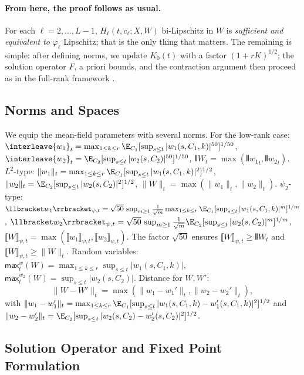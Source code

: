 \documentclass[nohyperref]{article}
\theoremstyle{plain}
\theoremstyle{definition}
\theoremstyle{remark}
\begin{document}
\paragraph*{From here, the proof follows as usual.} For each $\ell=2,\ldots,L-1$, $H_\ell(t,c_\ell;X,W)$ bi-Lipschitz in $W$ is \emph{sufficient and equivalent to} $\varphi_\ell$ Lipschitz; that is the only thing that matters. The remaining is simple: after defining norms, we update $K_0(t)$ with a factor $(1+rK)^{1/2}$; the solution operator $F$, a priori bounds, and the contraction argument then proceed as in the full-rank framework \cite{nguyen2023rigorousframeworkmeanfield}.

\subsection{Norms and Spaces}
\label{app:wellposed-norms}

We equip the mean-field parameters with several norms. For the low-rank case: ${\interleave{w_1}}_t = \max_{1\le k\le r}\E_{C_1}[\sup_{s\le t}|w_1(s,C_1,k)|^{50}]^{1/50}$, ${\interleave{w_2}}_t = \E_{C_2}[\sup_{s\le t}|w_2(s,C_2)|^{50}]^{1/50}$, ${\interleave{W}}_t = \max({\interleave{w_1}}_t, {\interleave{w_2}}_t)$. $L^2$-type: $\|w_1\|_t = \max_{1\le k\le r}\E_{C_1}[\sup_{s\le t}|w_1(s,C_1,k)|^2]^{1/2}$, $\|w_2\|_t = \E_{C_2}[\sup_{s\le t}|w_2(s,C_2)|^2]^{1/2}$, $\|W\|_t = \max(\|w_1\|_t, \|w_2\|_t)$. $\psi_2$-type: $\llbracket w_1\rrbracket_{\psi,t} = \sqrt{50}\,\sup_{m\ge 1}\frac{1}{\sqrt{m}}\max_{1\le k\le r}\E_{C_1}[\sup_{s\le t}|w_1(s,C_1,k)|^m]^{1/m}$, $\llbracket w_2\rrbracket_{\psi,t} = \sqrt{50}\,\sup_{m\ge 1}\frac{1}{\sqrt{m}}\E_{C_2}[\sup_{s\le t}|w_2(s,C_2)|^m]^{1/m}$, $\llbracket W\rrbracket_{\psi,t} = \max(\llbracket w_1\rrbracket_{\psi,t}, \llbracket w_2\rrbracket_{\psi,t})$. The factor $\sqrt{50}$ ensures $\llbracket W\rrbracket_{\psi,t}\ge {\interleave{W}}_t$ and $\llbracket W\rrbracket_{\psi,t}\ge \|W\|_t$. Random variables: $\mathsf{max}_t^w(W) = \max_{1\le k\le r}\sup_{s\le t}|w_1(s,C_1,k)|$, $\mathsf{max}_t^{w_2}(W) = \sup_{s\le t}|w_2(s,C_2)|$. Distance for $W,W'$:
\begin{equation}\label{eq:def-MF-distance-app}\|W-W'\|_t = \max(\|w_1-w_1'\|_t, \|w_2-w_2'\|_t),\end{equation}
with $\|w_1-w_1'\|_t = \max_{1\le k\le r}\E_{C_1}[\sup_{s\le t}|w_1(s,C_1,k)-w_1'(s,C_1,k)|^2]^{1/2}$ and $\|w_2-w_2'\|_t = \E_{C_2}[\sup_{s\le t}|w_2(s,C_2)-w_2'(s,C_2)|^2]^{1/2}$.

\subsection{Solution Operator and Fixed Point Formulation}
\end{document}
